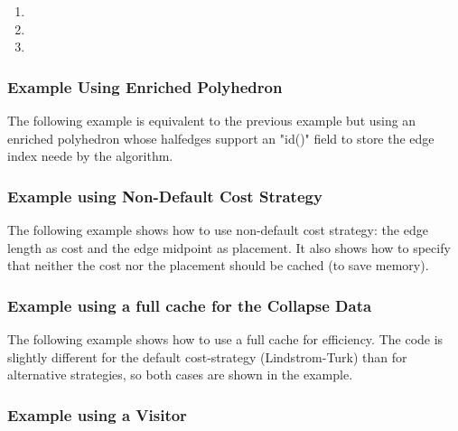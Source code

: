 \begin{enumerate}
\item {}
\item {}
\item {}
\end{enumerate}


\subsubsection{Example Using Enriched Polyhedron}

The following example is equivalent to the previous example but using an
enriched polyhedron whose halfedges support an "id()" field to
store the edge index neede by the algorithm.


\subsubsection{Example using Non-Default Cost Strategy}

The following example shows how to use non-default cost strategy: the edge length as cost 
and the edge midpoint as placement. It also shows how to specify that neither the cost nor 
the placement should be cached (to save memory).


\subsubsection{Example using a full cache for the Collapse Data}

The following example shows how to use a full cache for efficiency. The code
is slightly different for the default cost-strategy (Lindstrom-Turk) 
than for alternative strategies, so both cases are shown in the example.


\subsubsection{Example using a Visitor}

